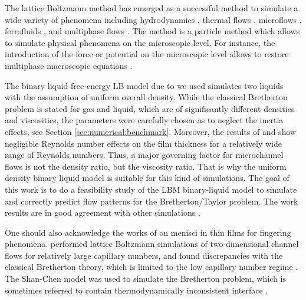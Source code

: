 \documentclass{article}
\begin{document}
The lattice Boltzmann method has emerged as a successful method to simulate
a wide variety of phenomena including hydrodynamics \cite{yu}, thermal flows
\cite{karlin-minimalmodels}, microflows \cite{ansumali-small-knudsen},
ferrofluids \cite{kuzmin-aniso}, and multiphase flows
\cite{swift,Shan-chen:extended}. The method is a particle method which allows to simulate physical
phenomena on the microscopic level. For instance, the introduction of the force or potential on the
microscopic level allows to restore multiphase macroscopic equations \cite{swift,
Shan-chen:extended}.

The binary liquid free-energy LB model due to \citet{swift} we used
simulates two liquids with the assumption of uniform overall
density. While the classical Bretherton problem is stated for gas and liquid, which are of
significantly
different densities and viscosities, the parameters were carefully chosen as to neglect the inertia
effects, see Section \ref{sec:numerical:benchmark}. Moreover, the results of
\citet{giavedoni-numerical} and \citet{heil-bretherton} show
negligible Reynolds number effects on the film thickness for a relatively wide range of Reynolds
numbers. Thus, a major governing factor for microchannel flows is not the density ratio, but
the
viscosity ratio. That is why the uniform density binary liquid model is suitable for this kind of
simulations. The goal of this work is to do a feasibility study of the LBM
binary-liquid model to simulate and correctly predict flow patterns for the Bretherton/Taylor
problem. The work results are in good agreement with other simulations
\cite{heil-threedim,wang-non-circular}. 

One should also acknowledge the works of \citet{pagonabarraga-fingers} on menisci
in thin films for fingering phenomena. \citet{sehgal-microchannel} performed lattice Boltzmann
simulations of two-dimensional channel flows for relatively large capillary numbers, and
found discrepancies with the classical Bretherton theory, which
is limited to the low capillary number regime \cite{giavedoni-numerical}. The Shan-Chen model was
used to simulate the Bretherton problem, which is sometimes referred to contain thermodynamically
inconsistent interface \cite{nourgaliev-breakup}. 
\end{document}
